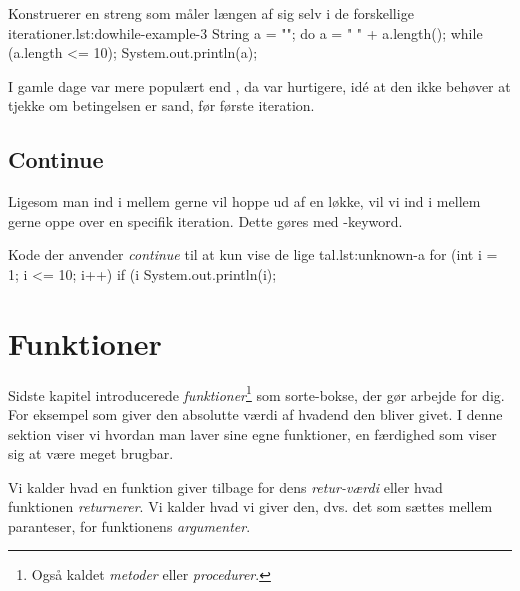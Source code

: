 		\begin{JavaCode}{Konstruerer en streng som måler længen af sig selv i de forskellige iterationer.}{lst:dowhile-example-3}
			String a = "";
			do {
				a = " " + a.length();
			} while (a.length <= 10);
			System.out.println(a);
		\end{JavaCode}

        I gamle dage var  mere populært end
        , da  var
        hurtigere, idé at den ikke behøver at tjekke om betingelsen er
        sand, før første iteration.

	\subsection{Continue}

        Ligesom man ind i mellem gerne vil hoppe ud af en løkke, vil
        vi ind i mellem gerne oppe over en specifik iteration. Dette gøres med -keyword.

		\begin{JavaCode}{Kode der anvender \emph{continue} til at kun vise de lige tal.}{lst:unknown-a}
			for (int i = 1; i <= 10; i++) {
				if (i %
				System.out.println(i);
			}
		\end{JavaCode}


\section{Funktioner}

    Sidste kapitel introducerede \emph{funktioner}\footnote{Også
    kaldet \emph{metoder} eller \emph{procedurer}.} som sorte-bokse,
    der gør arbejde for dig. For eksempel  som
    giver den absolutte værdi af hvadend den bliver givet. I denne
    sektion viser vi hvordan man laver sine egne funktioner, en
    færdighed som viser sig at være meget brugbar.

    Vi kalder hvad en funktion giver tilbage for dens
    \emph{retur-værdi} eller hvad funktionen \emph{returnerer}. Vi
    kalder hvad vi giver den, dvs. det som sættes mellem paranteser,
    for funktionens \emph{argumenter}.

     

